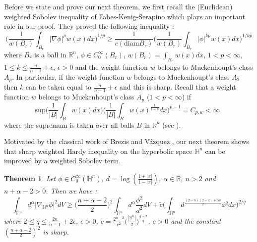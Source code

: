 \documentclass[12pt]{amsart}
\numberwithin{equation}{section}
\newtheorem{theorem}{Theorem}
\numberwithin{theorem}{section}
\numberwithin{theorem}{section} \numberwithin{lemma}{section}
\numberwithin{definition}{section}
\numberwithin{corollary}{section}
\numberwithin{remark}{section}
\numberwithin{proposition}{section}
\begin{document}
Before we state and prove our next theorem, we first recall the
(Euclidean) weighted Sobolev inequality of Fabes-Kenig-Serapino
\cite{Kenig} which plays an important role in our proof. They proved
the following inequality :
\begin{equation}\Big(\frac{1}{w(B_r)}\int_{B_r}|\nabla\phi|^p
w(x)dx\Big)^{1/p}\ge \frac{1}{c(\text{diam}
B_r)}\Big(\frac{1}{w(B_r)}\int_{B_r}|\phi|^{kp}w(x)dx\Big)^{1/kp}
\end{equation} where $B_r$ is a ball in
$\mathbb{R}^n$,  $\phi\in C_0^{\infty}(B_r)$,
$w(B_r)=\int_{B_r}w(x)dx$, $1<p<\infty$, $1\le k\le
\frac{n}{n-1}+\epsilon$, $\epsilon>0$ and the weight function $w$
belongs to Muckenhoupt's class $A_p$. In particular, if the weight
function $w$ belongs to Muckenhoupt's class $A_2$ then $k$ can be
taken equal to $\frac{n}{n-1}+\epsilon$ and this is sharp. Recall
that a weight function $w$ belongs to Muckenhoupt's class $A_p$
($1<p<\infty$) if
\[\text{sup}\Big(\frac{1}{|B|}\int_{B}w(x)dx\Big)\Big(\frac{1}{|B|}\int_{B}w(x)^{\frac{1}{1-p}}dx\Big)^{p-1}=
C_{p,w}<\infty, \]  where the supremum is taken over all balls $B$
in $\mathbb{R}^n$ (see \cite{Stein}).
\medskip

Motivated by the classical work of Brezis and V\'azquez \cite{Brezis},
our next theorem shows that sharp weighted Hardy inequality on the
hyperbolic space $\mathbb{H}^n$ can be improved by a weighted
Sobolev term.

\begin{theorem}
Let  $\phi\in C_0^{\infty}(\mathbb{H}^n)$, $d=\log
(\frac{1+|x|}{1-|x|})$, $\alpha\in\mathbb{R}$, $n>2$ and
$n+\alpha-2>0$. Then we have : \begin{equation}\int_{ \mathbb{H}^n
}d^{\alpha}|\nabla_{\mathbb{H}^n}\phi|^2dV\ge
\Big(\frac{n+\alpha-2}{2}\Big)^2\int_ {\mathbb
{H}^n}d^{\alpha}\frac{\phi^2}{d^2}dV+ \tilde{c}\Big(\int_{
\mathbb{H}^n} d^{\frac{(2-n)(2-q)+\alpha q}{2}}\phi^qdx\Big)^{2/q}
 \end{equation} where $2\le q\le \frac{2n}{n-1}+2\epsilon$, $\epsilon>0$, $\tilde{c}=
\frac{2^{n-2}}{c^2}\big(\frac{|\mathbb{S}^n|}{2}\big)^{\frac{q-2}{q}}
$, $c>0$ and  the constant $(\frac{n+\alpha-2}{2})^2$ is sharp.
\end{theorem}
\end{document}
